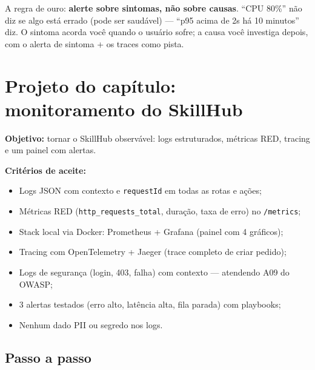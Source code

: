 \begin{caixaconceito}
A regra de ouro: \textbf{alerte sobre sintomas, não sobre causas}. ``CPU 80\%''
não diz se algo está errado (pode ser saudável) — ``p95 acima de 2s há 10
minutos'' diz. O sintoma acorda você quando o usuário sofre; a causa você
investiga depois, com o alerta de sintoma + os traces como pista.
\end{caixaconceito}

\section{Projeto do capítulo: monitoramento do SkillHub}
\label{sec:projeto22}

\begin{caixaprojeto}
\textbf{Objetivo:} tornar o SkillHub observável: logs estruturados, métricas
RED, tracing e um painel com alertas.

\textbf{Critérios de aceite:}
\begin{itemize}[leftmargin=*, itemsep=0.2em]
  \item Logs JSON com contexto e \texttt{requestId} em todas as rotas e ações;
  \item Métricas RED (\texttt{http\_requests\_total}, duração, taxa de erro) no \texttt{/metrics};
  \item Stack local via Docker: Prometheus + Grafana (painel com 4 gráficos);
  \item Tracing com OpenTelemetry + Jaeger (trace completo de criar pedido);
  \item Logs de segurança (login, 403, falha) com contexto — atendendo A09 do OWASP;
  \item 3 alertas testados (erro alto, latência alta, fila parada) com playbooks;
  \item Nenhum dado PII ou segredo nos logs.
\end{itemize}
\end{caixaprojeto}

\subsection{Passo a passo}

